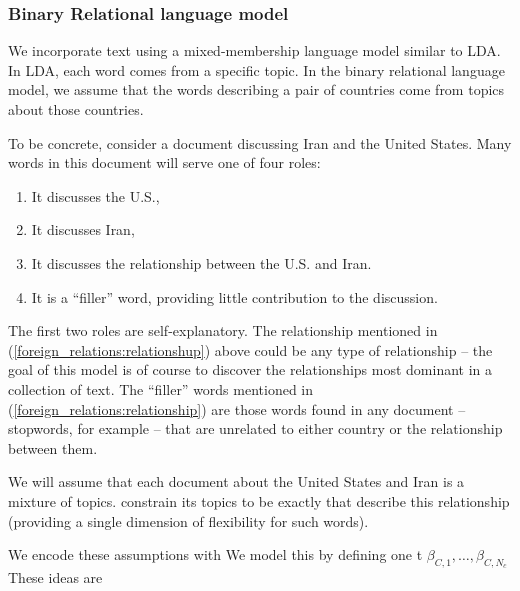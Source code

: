 \subsubsection*{Binary Relational language model}
We incorporate text using a mixed-membership language model similar to
LDA.  In LDA, each word comes from a specific topic.  In the binary
relational language model, we assume that the words describing a pair
of countries come from topics about those countries.

To be concrete, consider a document discussing Iran and the United
States.  Many words in this document will serve one of
four roles:
\begin{enumerate}
  \item It discusses the U.S.,
  \item It discusses Iran,
  \item It discusses the relationship between the U.S. and Iran. \label{foreign_relations:relationship}
  \item It is a ``filler'' word, providing little contribution to the discussion. \label{foreign_relations:filler}
\end{enumerate}
The first two roles are self-explanatory.  The relationship mentioned
in (\ref{foreign_relations:relationshup}) above could be any type of
relationship -- the goal of this model is of course to discover the
relationships most dominant in a collection of text.  The ``filler''
words mentioned in (\ref{foreign_relations:relationship}) are those
words found in any document -- stopwords, for example -- that are
unrelated to either country or the relationship between them.

We will assume that each document about the United States and Iran is
a mixture of topics. constrain its topics to be exactly that
describe this relationship (providing a single dimension of
flexibility for such words).



We encode these assumptions with
We model this by defining one t $\beta_{C,1}, \ldots, \beta_{C,N_c}$
These ideas are

